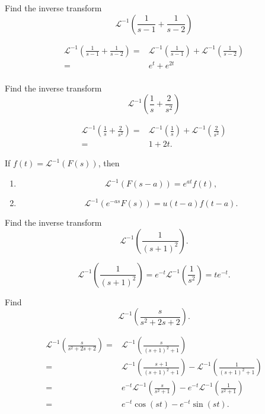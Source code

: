 \begin{example}
  Find the inverse transform
  \[\mathcal{L}^{-1}\left(\frac{1}{s-1}+\frac{1}{s-2}\right)\]
\end{example}
\begin{solution}
  \[
  \begin{aligned}
    \mathcal{L}^{-1}\left(\frac{1}{s-1}+\frac{1}{s-2}\right)
    =& \mathcal{L}^{-1}\left(\frac{1}{s-1}\right)+\mathcal{L}^{-1}\left(\frac{1}{s-2}\right)\\ 
    =& e^t + e^{2t}\\ 
  \end{aligned}
  \]
\end{solution}

\begin{exercise}
  Find the inverse transform
  \[\mathcal{L}^{-1}\left(\frac{1}{s}+\frac{2}{s^2}\right)\]
\end{exercise}
\begin{exersol}
  \[
  \begin{aligned}
    \mathcal{L}^{-1}\left(\frac{1}{s}+\frac{2}{s^2}\right)
    =& \mathcal{L}^{-1}\left(\frac{1}{s}\right)+\mathcal{L}^{-1}\left(\frac{2}{s^2}\right)\\ 
    =& 1 + 2t. 
  \end{aligned}
  \]
\end{exersol}

\begin{theorem}
  If $f(t)=\mathcal{L}^{-1}(F(s))$, then
  \begin{enumerate}
    \item \[\mathcal{L}^{-1}(F(s-a))=e^{at}f(t),\]
    \item \[\mathcal{L}^{-1}(e^{-as}F(s))=u(t-a)f(t-a).\]
  \end{enumerate} 
\end{theorem}

\begin{example}
  Find the inverse transform
  \[\mathcal{L}^{-1}\left(\frac{1}{(s+1)^2}\right).\]
\end{example}
\begin{solution}
  \[\mathcal{L}^{-1}\left(\frac{1}{(s+1)^2}\right)=e^{-t}\mathcal{L}^{-1}\left(\frac{1}{s^2}\right)=te^{-t}.\]
\end{solution}

\begin{example}
  Find
  \[\mathcal{L}^{-1}\left(\frac{s}{s^2+2s+2}\right).\]
\end{example}
\begin{solution}
  \[
  \begin{aligned}
    \mathcal{L}^{-1}\left(\frac{s}{s^2+2s+2}\right)=&\mathcal{L}^{-1}\left(\frac{s}{(s+1)^2+1}\right)\\
    =&\mathcal{L}^{-1}\left(\frac{s+1}{(s+1)^2+1}\right)-\mathcal{L}^{-1}\left(\frac{1}{(s+1)^2+1}\right)\\
    =&e^{-t}\mathcal{L}^{-1}\left(\frac{s}{s^2+1}\right)-e^{-t}\mathcal{L}^{-1}\left(\frac{1}{s^2+1}\right)\\
    =&e^{-t}\cos(st)-e^{-t}\sin(st).
  \end{aligned}  
  \]
\end{solution}

